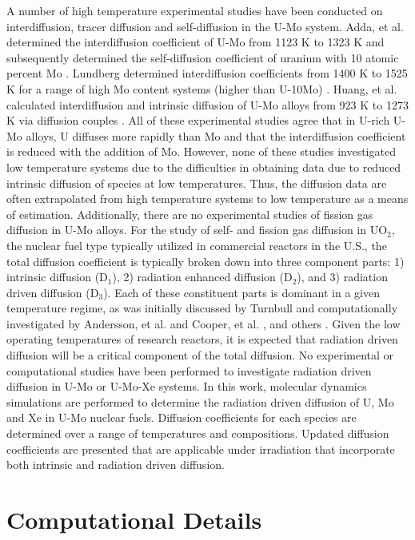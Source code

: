 \documentclass[default]{sn-jnl}%
\begin{document}
{A number of high temperature experimental studies have been conducted on interdiffusion, tracer diffusion and self-diffusion in the U-Mo system. Adda, et al. determined the interdiffusion coefficient of U-Mo from 1123 K to 1323 K and subsequently determined the self-diffusion coefficient of uranium with 10 atomic percent Mo \cite{adda1962}. Lundberg determined interdiffusion coefficients from 1400 K to 1525 K for a range of high Mo content systems (higher than U-10Mo) \cite{lundberg1989}. Huang, et al. calculated interdiffusion and intrinsic diffusion of U-Mo alloys from 923 K to 1273 K via diffusion couples \cite{huang2013}. All of these experimental studies agree that in U-rich U-Mo alloys, U diffuses more rapidly than Mo and that the interdiffusion coefficient is reduced with the addition of Mo. However, none of these studies investigated low temperature systems due to the difficulties in obtaining data due to reduced intrinsic diffusion of species at low temperatures. Thus, the diffusion data are often extrapolated from high temperature systems to low temperature as a means of estimation. Additionally, there are no experimental studies of fission gas diffusion in U-Mo alloys. 
For the study of self- and fission gas diffusion in UO$_2$, the nuclear fuel type typically utilized in commercial reactors in the U.S., the total diffusion coefficient is typically broken down into three component parts: 1) intrinsic diffusion (D$_1$), 2) radiation enhanced diffusion (D$_2$), and 3) radiation driven diffusion (D$_3$). Each of these constituent parts is dominant in a given temperature regime, as was initially discussed by Turnbull \cite{turnbull1982} and computationally investigated by Andersson, et al. \cite{andersson2014} and Cooper, et al. \cite{cooper2016}, and others \cite{matthews_cluster_2019, perriot_atomistic_2019, wormald2015, martin2009}. Given the low operating temperatures of research reactors, it is expected that radiation driven diffusion will be a critical component of the total diffusion. No experimental or computational studies have been performed to investigate radiation driven diffusion in U-Mo or U-Mo-Xe systems.
In this work, molecular dynamics simulations are performed to determine the radiation driven diffusion of U, Mo and Xe in U-Mo nuclear fuels. Diffusion coefficients for each species are determined over a range of temperatures and compositions. Updated diffusion coefficients are presented that are applicable under irradiation that incorporate both intrinsic and radiation driven diffusion. 
}
\section{Computational Details}\label{sec2}
\end{document}
